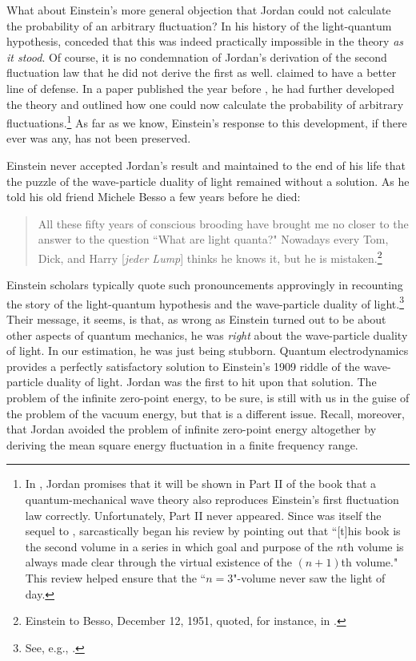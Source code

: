 \documentclass{elsart}
\begin{document}
What about Einstein's more general objection that Jordan could not calculate the probability of an arbitrary fluctuation? In his history of the light-quantum hypothesis, \citet[p.\ 194]{Jordan 1928} conceded that this was indeed practically impossible in the theory {\it as it stood}. Of course, it is no condemnation of Jordan's derivation of the second fluctuation law that he did not derive the first as well. \citet[p.\ 194, p.\ 201]{Jordan 1928} claimed to have a better line of defense. In a paper published the year before \citep[pp.\ 772--774]{Jordan 1927c}, he had further developed the theory and outlined how one could now calculate the probability of arbitrary fluctuations.\footnote{In \citep[p.\ 399]{Born and Jordan 1930}, Jordan promises that it will be shown in Part II of the book that a quantum-mechanical wave theory also reproduces Einstein's first fluctuation law correctly. Unfortunately, Part II never appeared. Since \citep[p.\ 399]{Born and Jordan 1930} was itself the sequel to \citep{Born 1925}, \citet{Pauli 1930} sarcastically began his review by pointing out that ``[t]his book is the second volume in a series in which goal and purpose of the $n$th volume is always made clear through the virtual existence of the $(n+1)$th volume." This review helped ensure that the ``$n=3$"-volume never saw the light of day.} As far as we know, Einstein's response to this development, if there ever was any, has not been preserved. 

Einstein never accepted Jordan's result and maintained to the end of his life that the puzzle of the wave-particle duality of light remained without a solution. As he told his old friend Michele Besso a few years before he died:
\begin{quotation}
All these fifty years of conscious brooding have brought me no closer to the answer to the question ``What are light quanta?" Nowadays every Tom, Dick, and Harry [{\it jeder Lump}] thinks he knows it, but he is mistaken.\footnote{Einstein to Besso, December 12, 1951, quoted, for instance, in \citep[p.\ 133, p.\ 138]{Klein 1979}.}
\end{quotation}
Einstein scholars typically quote such pronouncements approvingly in recounting the story of the light-quantum hypothesis and the wave-particle duality of light.\footnote{See, e.g., \citep[pp.\ 379--380]{Stachel 1986}.} Their message, it seems, is that, as wrong as Einstein turned out to be about other aspects of quantum mechanics, he was {\it right} about the wave-particle duality of light. In our estimation, he was just being stubborn. Quantum electrodynamics provides a perfectly satisfactory solution to Einstein's 1909 riddle of the wave-particle duality of light. Jordan was the first to hit upon that solution. The problem of the infinite zero-point energy, to be sure, is still with us in the guise of the problem of the vacuum energy, but that is a different issue. Recall, moreover, that Jordan avoided the problem of infinite zero-point energy altogether by deriving the mean square energy fluctuation in a finite frequency range. 
\end{document}
